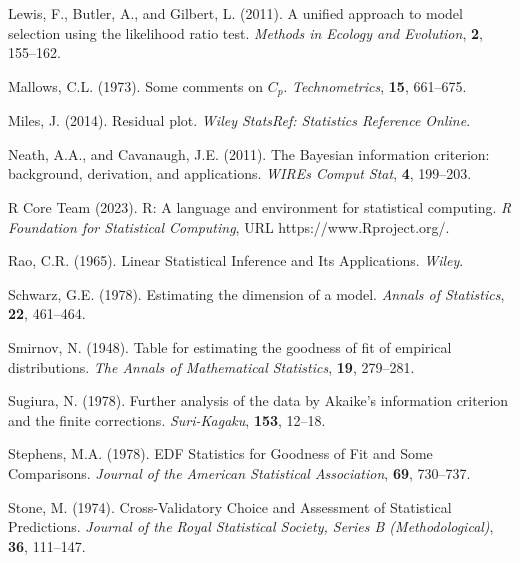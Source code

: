 \phantom{a}

\rff Lewis, F., Butler, A., and Gilbert, L. (2011).
      A unified approach to model selection using the likelihood ratio test.
      {\it Methods in Ecology and Evolution},
      {\bf 2}, {155--162}.

\phantom{a}

\rff Mallows, C.L. (1973).
      Some comments on $C_p$.
      {\it Technometrics},
      {\bf 15}, {661--675}.

\phantom{a}

\rff Miles, J. (2014).
      Residual plot.
      {\it Wiley StatsRef: Statistics Reference Online}.      

\phantom{a}

\rff Neath, A.A., and Cavanaugh, J.E. (2011).
      The Bayesian information criterion: background, derivation, and applications.
      {\it WIREs Comput Stat},
      {\bf 4}, {199--203}.
      
\phantom{a}

\rff R Core Team (2023).
      R: A language and environment for statistical computing.
      {\it R Foundation for Statistical Computing},
      URL https://www.Rproject.org/.

\phantom{a}

\rff Rao, C.R. (1965).
      Linear Statistical Inference and Its Applications.
      {\it Wiley}.

\phantom{a}

\rff Schwarz, G.E. (1978).
      Estimating the dimension of a model.
      {\it Annals of Statistics},
      {\bf 22}, {461--464}.

\phantom{a}

\rff Smirnov, N. (1948).
    Table for estimating the goodness of fit of empirical distributions.
    {\it The Annals of Mathematical Statistics},
    {\bf 19}, {279--281}.

\phantom{a}

\rff Sugiura, N. (1978).
      Further analysis of the data by Akaike's information criterion and the finite corrections.
      {\it Suri-Kagaku},
      {\bf 153}, {12--18}.

\phantom{a}

\rff Stephens, M.A. (1978).
      EDF Statistics for Goodness of Fit and Some Comparisons.
      {\it Journal of the American Statistical Association},
      {\bf 69}, {730--737}.

\phantom{a}

\rff Stone, M. (1974).
      Cross-Validatory Choice and Assessment of Statistical Predictions.
      {\it Journal of the Royal Statistical Society, Series B (Methodological)},
      {\bf 36}, {111--147}.

